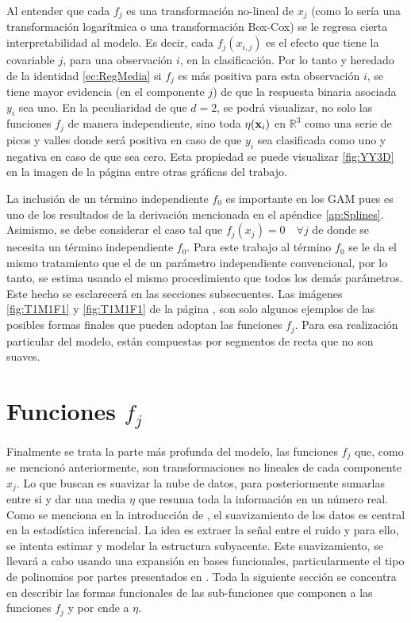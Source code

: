 \documentclass[../Main/Main.tex]{subfiles}
\begin{document}
Al entender que cada $f_j$ es una transformación no-lineal de $x_j$ (como lo sería una transformación logarítmica o una transformación Box-Cox) se le regresa cierta interpretabilidad al modelo. Es decir, cada $f_j(x_{i,j})$ es el efecto que tiene la covariable $j$, para una observación $i$, en la clasificación. Por lo tanto y heredado de la identidad \eqref{ec:RegMedia} si $f_j$ es más positiva para esta observación $i$, se tiene mayor evidencia (en el componente $j$) de que la respuesta binaria asociada $y_i$ sea uno. En la peculiaridad de que $d = 2$, se podrá visualizar, no solo las funciones $f_j$ de manera independiente, sino toda $\eta(\mathbf{x}_i)$ en $\mathbb{R}^3$ como una serie de picos y valles donde será positiva en caso de que $y_i $ sea clasificada como uno y  negativa en caso de que sea cero. Esta propiedad se puede visualizar \ref{fig:YY3D} en la imagen de la página \pageref{fig:YY3D} entre otras gráficas del trabajo.

La inclusión de un término independiente $f_0$ es importante en los GAM pues es uno de los resultados de la derivación mencionada en el apéndice \ref{ap:Splines}. Asimismo, se debe considerar el caso tal que $f_j(x_j)=0\quad\forall j$ de donde se necesita un término independiente $f_0$. Para este trabajo al término $f_0$ se le da el mismo tratamiento que el de un parámetro independiente convencional, por lo tanto, se estima usando el mismo procedimiento que todos los demás parámetros. Este hecho se esclarecerá en las secciones subsecuentes. Las imágenes \ref{fig:T1M1F1} y  \ref{fig:T1M1F1} de la página \pageref{fig:T1M1F1}, son solo algunos ejemplos de las posibles formas finales que pueden adoptan las funciones $f_j$. Para esa realización particular del modelo, están compuestas por segmentos de recta que no son suaves.

\section{Funciones $f_j$} \label{sec:fj}
Finalmente se trata la parte más profunda del modelo, las funciones $f_j$  que, como se mencionó anteriormente, son transformaciones no lineales de cada componente $x_j$. Lo que buscan es suavizar la nube de datos, para posteriormente sumarlas entre si y dar una media $\eta$ que resuma toda la información en un número real. Como se menciona en la introducción de \citet{hardle2004semiparametric}, el suavizamiento de los datos es central en la estadística inferencial. La idea es extraer la señal entre el ruido y para ello, se intenta estimar y modelar la estructura subyacente. Este suavizamiento, se llevará a cabo usando una expansión en bases funcionales, particularmente el tipo de polinomios por partes presentados en \citet{mallik1998automatic}. Toda la siguiente sección se concentra en describir las formas funcionales de las sub-funciones que componen a las funciones $f_j$ y por ende a $\eta$. 
\end{document}
